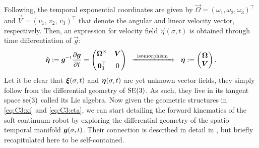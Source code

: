 Following, the temporal exponential coordinates are given by $\vec{\Omega} = (\omega_1, \omega_2, \omega_3)^\top$ and $\vec{V} = (v_1,\,v_2,\, v_3)^\top$ that denote the angular and linear velocity vector, respectively. Then, an expression for velocity field $\vec{\eta}(\sigma,t)$ is obtained through time differentiation of $\vec{g}$:
%
\begin{equation}
\hat{\vec{\eta}} := \mat{g}\inv \frac{\p \mat{g}}{\p t} = \begin{pmatrix} \vec{\Omega}^\times & \vec{V} \\[0.5em] \vec{0}_3^\top & 0 \end{pmatrix} \;\; \xRightarrow[]{\textrm{\;\;isomorphism\;\;}} \;\; \vec{\eta} := \begin{pmatrix} \vec{\Omega} \\ \vec{V} \end{pmatrix}.
\label{eq:C3:eta}
\end{equation}
%
Let it be clear that ${\boldsymbol{\xi}}(\sigma,t)$ and ${\boldsymbol{\eta}}(\sigma,t)$ are yet unknown {vector fields}, they simply follow from the differential geometry of $\textup{\textrm{SE}}(3)$. As such, they live in its tangent space $\textup{\textrm{se}}(3)$ called its Lie algebra. Now given the geometric structures in \eqref{eq:C3:xi} and \eqref{eq:C3:eta}, we can start detailing the forward kinematics of the soft continuum robot by exploring the differential geometry of the spatio-temporal manifold ${\boldsymbol{g}}(\sigma,t)$. Their connection is described in detail in \cite{Simo1986,Boyer2010,Boyer2021,Renda2017Aug,Renda2018}, but briefly recapitulated here to be self-contained. 

